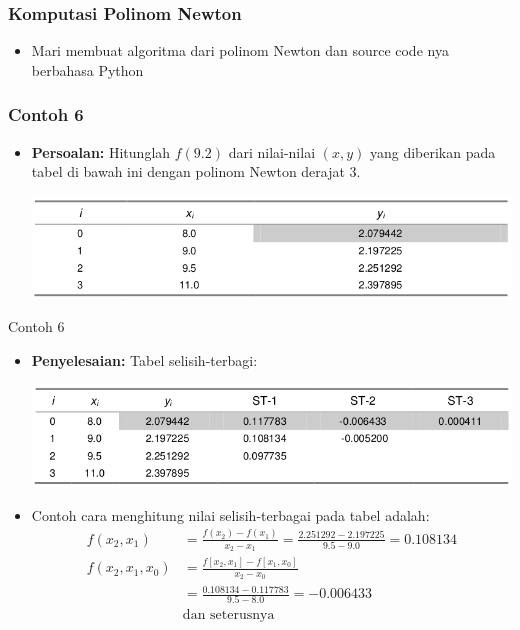 \documentclass[pdflatex,compress,mathserif]{beamer}
\begin{document}
\begin{frame}
	\frametitle{Komputasi Polinom Newton}
	\begin{itemize}
		\item Mari membuat algoritma dari polinom Newton dan source code nya berbahasa Python
	\end{itemize}
\end{frame}

\begin{frame}
	\frametitle{Contoh 6}
	\begin{itemize}
		\item \textbf{Persoalan:} Hitunglah $ f(9.2) $ dari nilai-nilai $ (x, y) $ yang diberikan pada tabel di bawah ini dengan polinom Newton derajat 3.
		\begin{center}
			\includegraphics[width=\linewidth]{img/img12}
		\end{center}
	\end{itemize}
\end{frame}

\begin{frame}{Contoh 6}
	\begin{itemize}
		\item \textbf{Penyelesaian:} Tabel selisih-terbagi:
		\begin{center}
			\includegraphics[width=\linewidth]{img/img13}
		\end{center}
		\item Contoh cara menghitung nilai selisih-terbagai pada tabel adalah:
		\begin{align*}
			f(x_2, x_1) &= \frac{f(x_2) - f(x_1)}{x_2 - x_1} = \frac{2.251292 - 2.197225}{9.5 - 9.0} = 0.108134 \\
			f(x_2, x_1, x_0) &= \frac{f[x_2,x_1] - f[x_1,x_0]}{x_2 - x_0}\\
			&= \frac{0.108134 - 0.117783}{9.5 - 8.0} = -0.006433 \\
			&\text{dan seterusnya}
		\end{align*}
	\end{itemize}
\end{frame}
\end{document}
